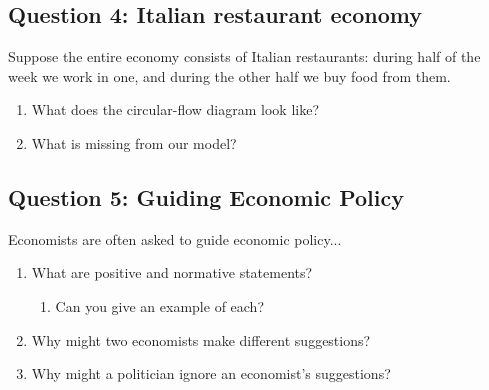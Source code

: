 \documentclass[12pt]{article}
\begin{document}
\subsection*{Question 4: Italian restaurant economy}
Suppose the entire economy consists of Italian restaurants: during half of the week we work in one, and during the other half we buy food from them.
\begin{enumerate}
    \item What does the circular-flow diagram look like?
    \item What is missing from our model?
\end{enumerate}

\subsection*{Question 5: Guiding Economic Policy}
Economists are often asked to guide economic policy...
\medskip
\begin{enumerate}
    \item What are positive and normative statements?
    \begin{enumerate}
        \item Can you give an example of each?
    \end{enumerate}
    \item Why might two economists make different suggestions?
    \item Why might a politician ignore an economist's suggestions?
    
\end{enumerate}
\end{document}
